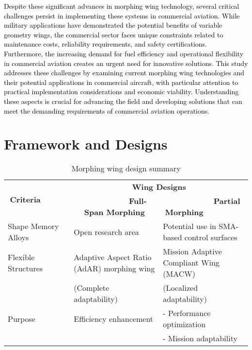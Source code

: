 \documentclass[letterpaper, journal, twoside]{IEEEtran}
\newcommand{\revision}[1]{\textcolor{black}{ #1}}
\begin{document}
\revision{Despite these significant advances in morphing wing technology, several critical challenges persist in implementing these systems in commercial aviation. While military applications have demonstrated the potential benefits of variable geometry wings, the commercial sector faces unique constraints related to maintenance costs, reliability requirements, and safety certifications. Furthermore, the increasing demand for fuel efficiency and operational flexibility in commercial aviation creates an urgent need for innovative solutions. This study addresses these challenges by examining current morphing wing technologies and their potential applications in commercial aircraft, with particular attention to practical implementation considerations and economic viability. Understanding these aspects is crucial for advancing the field and developing solutions that can meet the demanding requirements of commercial aviation operations.}


\section{Framework and Designs}\label{sec:framework}


\begin{table*}[h!]
\centering
\caption{Morphing wing design summary}
\label{tbl:wing_design_summary}
\begin{tabular}{@{}lll@{}}
\toprule
\multicolumn{1}{c}{\multirow{2}{*}{$\quad$$\quad$$\quad$$\quad$$\quad$\textbf{Criteria}$\quad$$\quad$$\quad$$\quad$$\quad$}} & \multicolumn{2}{c}{\textbf{Wing Designs}}                                                 \\ \cmidrule(l){2-3} 
\multicolumn{1}{c}{}                                   & \multicolumn{1}{c}{$\quad$$\quad$$\quad$$\quad$$\quad$$\quad$\textbf{Full-Span Morphing}}$\quad$$\quad$$\quad$$\quad$$\quad$$\quad$ & \multicolumn{1}{c}{$\quad$$\quad$$\quad$$\quad$$\quad$$\quad$\textbf{Partial Morphing}$\quad$$\quad$$\quad$$\quad$$\quad$$\quad$}             \\ \midrule
Shape Memory Alloys                                    & Open research area                     & Potential use in SMA-based control surfaces      \\
Flexible Structures                                    & Adaptive Aspect Ratio (AdAR) morphing wing            & Mission Adaptive Compliant Wing (MACW)                     \\
& (Complete adaptability) &  (Localized adaptability) \\
Purpose                                                & Efficiency enhancement                 & - Performance optimization\\ 
& & - Mission adaptability \\ \bottomrule
\end{tabular}
\end{table*}
\end{document}
